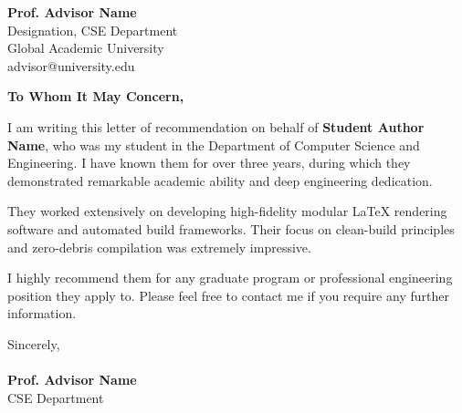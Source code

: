 \documentclass[11pt,a4paper]{article}
\begin{document}
\noindent
\textbf{Prof. Advisor Name} \\
Designation, CSE Department \\
Global Academic University \\
advisor@university.edu

\vspace{1cm}
\noindent
\textbf{To Whom It May Concern,}

\vspace{0.5cm}
I am writing this letter of recommendation on behalf of \textbf{Student Author Name}, who was my student in the Department of Computer Science and Engineering. I have known them for over three years, during which they demonstrated remarkable academic ability and deep engineering dedication.

They worked extensively on developing high-fidelity modular LaTeX rendering software and automated build frameworks. Their focus on clean-build principles and zero-debris compilation was extremely impressive.

I highly recommend them for any graduate program or professional engineering position they apply to. Please feel free to contact me if you require any further information.

\vspace{1.5cm}
\noindent
Sincerely,\\
\vspace{1cm}\\
\textbf{Prof. Advisor Name}\\
CSE Department
\end{document}
